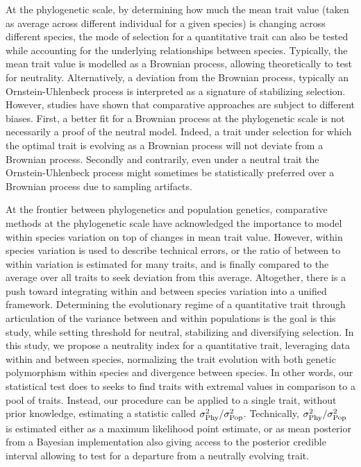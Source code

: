 \documentclass{article}
\begin{document}
At the phylogenetic scale, by determining how much the mean trait value (taken as average across different individual for a given species) is changing across different species, the mode of selection for a quantitative trait can also be tested while accounting for the underlying relationships between species\cite{felsenstein_phylogenies_1985}.
Typically, the mean trait value is modelled as a Brownian process, allowing theoretically to test for neutrality\cite{hansen_translating_1996, harmon_phylogenetic_2018}.
Alternatively, a deviation from the Brownian process, typically an Ornstein-Uhlenbeck process is interpreted as a signature of stabilizing selection\cite{catalan_drift_2019}.
However, studies have shown that comparative approaches are subject to different biases\cite{harmon_phylogenetic_2018}.
First, a better fit for a Brownian process at the phylogenetic scale is not necessarily a proof of the neutral model.
Indeed, a trait under selection for which the optimal trait is evolving as a Brownian process will not deviate from a Brownian process\cite{hansen_translating_1996}.
Secondly and contrarily, even under a neutral trait the Ornstein-Uhlenbeck process might sometimes be statistically preferred over a Brownian process due to sampling   artifacts\cite{silvestro_measurement_2015, cooper_cautionary_2016, price_detecting_2022}.

At the frontier between phylogenetics and population genetics, comparative methods at the phylogenetic scale have acknowledged the importance to model within species variation on top of changes in mean trait value\cite{fay_evaluating_2008, kostikova_bridging_2016, gaboriau_multiplatform_2020}.
However, within species variation is used to describe technical errors, or the ratio of between to within variation is estimated for many traits, and is finally compared to the average over all traits to seek deviation from this average\cite{rohlfs_modeling_2014, rohlfs_phylogenetic_2015}.
Altogether, there is a push toward integrating within and between species variation into a unified framework.
Determining the evolutionary regime of a quantitative trait through articulation of the variance between and within populations is the goal is this study, while setting threshold for neutral, stabilizing and diversifying selection.
In this study, we propose a neutrality index for a quantitative trait, leveraging data within and between species, normalizing the trait evolution with both genetic polymorphism within species and divergence between species.
In other words, our statistical test does to seeks to find traits with extremal values in comparison to a pool of traits.
Instead, our procedure can be applied to a single trait, without prior knowledge, estimating a statistic called $\sigma^2_{\text{Phy}} / \sigma^2_{\text{Pop}}$.
Technically, $\sigma^2_{\text{Phy}} / \sigma^2_{\text{Pop}}$ is estimated either as a maximum likelihood point estimate, or as mean posterior from a Bayesian implementation also giving access to the posterior credible interval allowing to test for a departure from a neutrally evolving trait.
\end{document}
